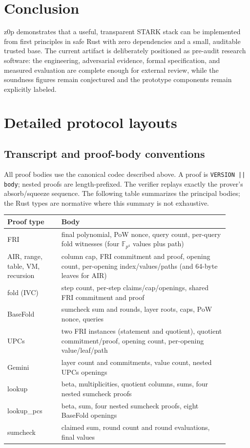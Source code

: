 \documentclass[11pt,a4paper]{article}
\newcommand{\zFpFour}{\mathbb{F}_{p^4}}
\begin{document}
\section{Conclusion}

z0p demonstrates that a useful, transparent STARK stack can be implemented
from first principles in safe Rust with zero dependencies and a small,
auditable trusted base. The current artifact is deliberately positioned as
pre-audit research software: the engineering, adversarial evidence, formal
specification, and measured evaluation are complete enough for external
review, while the soundness figures remain conjectured and the prototype
components remain explicitly labeled.


\section{Detailed protocol layouts}

\subsection{Transcript and proof-body conventions}

All proof bodies use the canonical codec described above. A proof is
\texttt{VERSION || body}; nested proofs are length-prefixed. The verifier
replays exactly the prover's absorb/squeeze sequence. The following table
summarizes the principal bodies; the Rust types are normative where this
summary is not exhaustive.

\begin{longtable}{@{}L{0.22\linewidth}L{0.68\linewidth}@{}}
\toprule
Proof type & Body \\
\midrule
\endhead
FRI & final polynomial, PoW nonce, query count, per-query fold witnesses
(four $\zFpFour$ values plus path) \\
AIR, range, table, VM, recursion & column cap, FRI commitment and proof, opening
count, per-opening index/values/paths (and 64-byte leaves for AIR) \\
fold (IVC) & step count, per-step claims/cap/openings, shared FRI commitment
and proof \\
BaseFold & sumcheck sum and rounds, layer roots, caps, PoW nonce, queries \\
UPCs & two FRI instances (statement and quotient), quotient commitment/proof,
opening count, per-opening value/leaf/path \\
Gemini & layer count and commitments, value count, nested UPCs openings \\
lookup & beta, multiplicities, quotient columns, sums, four nested sumcheck
proofs \\
lookup\_pcs & beta, sum, four nested sumcheck proofs, eight BaseFold
openings \\
sumcheck & claimed sum, round count and round evaluations, final values \\
\bottomrule
\end{longtable}
\end{document}
